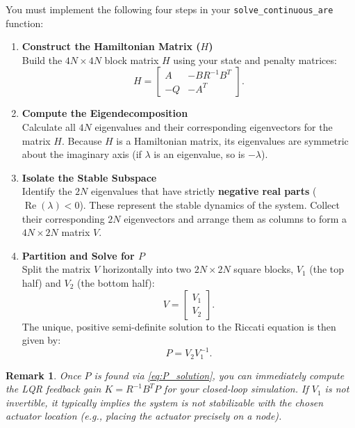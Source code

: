 \documentclass[11pt]{article}
\newtheorem*{remark}{Remark}
\begin{document}
You must implement the following four steps in your \texttt{solve\_continuous\_are} function:

\begin{enumerate}[label=\textbf{Step \arabic*:}, leftmargin=4em]
    \item \textbf{Construct the Hamiltonian Matrix ($H$)}\\
    Build the $4N \times 4N$ block matrix $H$ using your state and penalty matrices:
    \begin{equation}
    \label{eq:hamiltonian}
    H = 
    \begin{bmatrix}
    A & -B R^{-1} B^T \\
    -Q & -A^T
    \end{bmatrix}.
    \end{equation}
    
    \item \textbf{Compute the Eigendecomposition}\\
    Calculate all $4N$ eigenvalues and their corresponding eigenvectors for the matrix $H$. Because $H$ is a Hamiltonian matrix, its eigenvalues are symmetric about the imaginary axis (if $\lambda$ is an eigenvalue, so is $-\lambda$).
    
    \item \textbf{Isolate the Stable Subspace}\\
    Identify the $2N$ eigenvalues that have strictly \textbf{negative real parts} ($\operatorname{Re}(\lambda) < 0$). These represent the stable dynamics of the system. Collect their corresponding $2N$ eigenvectors and arrange them as columns to form a $4N \times 2N$ matrix $V$.
    
    \item \textbf{Partition and Solve for $P$}\\
    Split the matrix $V$ horizontally into two $2N \times 2N$ square blocks, $V_1$ (the top half) and $V_2$ (the bottom half):
    \begin{equation}
    \label{eq:V_partition}
    V = \begin{bmatrix} V_1 \\ V_2 \end{bmatrix}.
    \end{equation}
    The unique, positive semi-definite solution to the Riccati equation is then given by:
    \begin{equation}
    \label{eq:P_solution}
    P = V_2 V_1^{-1}.
    \end{equation}
\end{enumerate}

\begin{remark}
Once $P$ is found via \eqref{eq:P_solution}, you can immediately compute the LQR feedback gain $K = R^{-1}B^T P$ for your closed-loop simulation. If $V_1$ is not invertible, it typically implies the system is not stabilizable with the chosen actuator location (e.g., placing the actuator precisely on a node).
\end{remark}
\end{document}
